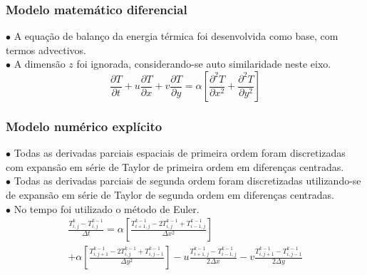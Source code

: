 \documentclass[xcolor=dvipsnames,10pt,aspectratio=169]{beamer}
\begin{document}
	\begin{frame} 
		\frametitle{Modelo matemático diferencial}
		$\bullet$ A equação de balanço da energia térmica foi desenvolvida como base, com termos advectivos.\\
		$\bullet$ A dimensão $z$ foi ignorada, considerando-se auto similaridade neste eixo.\\
	
		\begin{equation}
			\frac{\partial T}{\partial t} + u \frac{\partial T}{\partial x} + v \frac{\partial T}{\partial y} = \alpha \left[  \frac{\partial^2 T}{\partial x^2} + \frac{\partial^2 T}{\partial y^2}   \right] 
		\end{equation}

	\end{frame}





	\begin{frame} 
		\frametitle{Modelo numérico explícito}

		$\bullet$ Todas as derivadas parciais espaciais de primeira ordem foram discretizadas com expansão em série de Taylor de primeira ordem em diferenças centradas.\\
		$\bullet$ Todas as derivadas parciais de segunda ordem foram discretizadas utilizando-se de expansão em série de Taylor de segunda ordem em diferenças centradas.\\
		$\bullet$ No tempo foi utilizado o método de Euler.\\

		\begin{equation}
			\begin{split}
			\frac{T_{i,j}^{k} - T_{i , j}^{k-1} }{\Delta t}
			= \alpha \left[  \frac{T_{i+1,j}^{k-1} - 2 T_{i,j}^{k-1} + T_{i-1,j}^{k-1} }{\Delta x^2} \right]\\
			+\alpha \left[\frac{T_{i,j+1}^{k-1} - 2 T_{i,j}^{k-1} + T_{i,j-1}^{k-1}}{\Delta y^2}\right] - u \frac{T_{i+1,j}^{k-1} - T_{i-1,j}^{k-1}}{2 \Delta x} - v \frac{T_{i,j+1}^{k-1} - T_{i , j-1}^{k-1}}{2 \Delta y}  
			\end{split}
		\end{equation}

	\end{frame}
\end{document}
